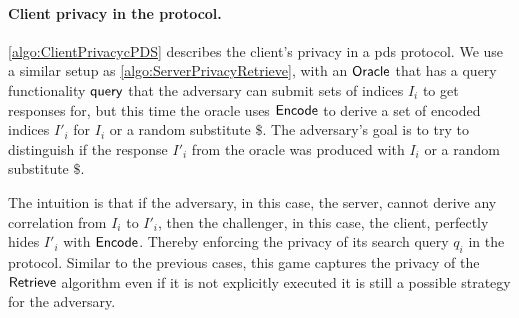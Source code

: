 \paragraph*{Client privacy in the protocol.}
\cref{algo:ClientPrivacycPDS} describes the client's privacy in a \acrshort{pds} protocol. We use a similar setup as \cref{algo:ServerPrivacyRetrieve}, with an $ \mathsf{{Oracle}} $ that has a query functionality $ \mathsf{{query}} $ that the adversary can submit sets of indices $ I_i $ to get responses for, but this time the oracle uses $ \mathsf{{Encode}} $ to derive a set of encoded indices $ I'_i $ for $ I_i $ or a random substitute $ \$ $. The adversary's goal is to try to distinguish if the response $ I'_i $ from the oracle was produced with $ I_i $ or a random substitute $ \$ $.

The intuition is that if the adversary, in this case, the server, cannot derive any correlation from $ I_i $ to $ I'_i $, then the challenger, in this case, the client, perfectly hides $ I'_i $ with $ \mathsf{{Encode}} $. Thereby enforcing the privacy of its search query $ q_i $ in the protocol. Similar to the previous cases, this game captures the privacy of the $ \mathsf{{Retrieve}} $ algorithm even if it is not explicitly executed it is still a possible strategy for the adversary.

\hfill

